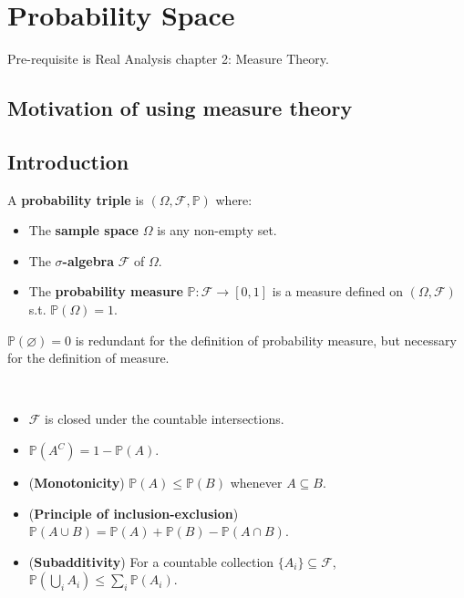 \chapter{Probability Space}
\begin{note}
    Pre-requisite is Real Analysis chapter 2: Measure Theory.
\end{note}
\section{Motivation of using measure theory} \label{sec:}


\section{Introduction} \label{sec:}


\begin{definition}
\normalfont 
A \textbf{probability triple} is $(\Omega, \mathcal{F}, \mathbb{P})$ where:
\begin{itemize}
    \item The \textbf{sample space} $\Omega$ is any non-empty set.
    \item The \textbf{$\sigma$-algebra} $\mathcal{F}$ of $\Omega$.
    \item The \textbf{probability measure} $\mathbb{P}: \mathcal{F} \to [0,1]$ is a measure defined on $(\Omega, \mathcal{F})$ s.t. $\mathbb{P}(\Omega) = 1$.
\end{itemize}
\end{definition}
\begin{remark}
    $\mathbb{P}(\varnothing) = 0$ is redundant for the definition of probability measure, but necessary for the definition of measure.
\end{remark}


\begin{corollary} ~
\normalfont 
\begin{itemize}
    \item $\mathcal{F}$ is closed under the countable intersections.
    \item $\mathbb{P}(A^{C}) = 1- \mathbb{P}(A)$.
    \item (\textbf{Monotonicity}) $\mathbb{P}(A) \le \mathbb{P}(B)$ whenever $A \subseteq B$.
    \item (\textbf{Principle of inclusion-exclusion}) $\mathbb{P}(A \cup B) = \mathbb{P}(A) + \mathbb{P}(B) - \mathbb{P}(A \cap B)$.
    \item (\textbf{Subadditivity}) For a countable collection $\{ A_i \} \subseteq \mathcal{F}$, $\mathbb{P}(\bigcup_{i} A_i) \le \sum\limits_{i} \mathbb{P}(A_i)$.
\end{itemize}
\end{corollary}

